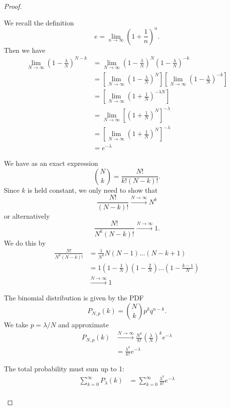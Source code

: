 \begin{proof}
	\begin{parts}
	\item We recall the definition 
		\[
		e = \lim_{n \to \infty} \left( 1+\frac{1}{n} \right)^n
		.\] 
		Then we have
		\begin{align*}
			\lim_{N \to \infty} \left( 1-\frac{\lambda}{N} \right)^{N - k} &=\lim_{N \to \infty} \left( 1-\frac{\lambda}{N} \right)^N \left( 1-\frac{\lambda}{N} \right)^{-k}\\
&=\left[\lim_{N \to \infty} \left( 1-\frac{\lambda}{N} \right)^N \right]\left[ \lim_{N \to \infty} \left( 1-\frac{\lambda}{N} \right)^{-k}\right]\\
&=\left[\lim_{N \to \infty} \left( 1+\frac{1}{N} \right)^{-\lambda N} \right]\\
&=\lim_{N \to \infty} \left[\left( 1+\frac{1}{N} \right)^{N}\right]^{-\lambda} \\
&=\left[\lim_{N \to \infty} \left( 1+\frac{1}{N} \right)^{N}\right]^{-\lambda} \\
&=e^{-\lambda}
		\end{align*}
	\item We have as an exact expression
		\[
		\binom{N}{k} = \frac{N!}{k!(N-k)!}
		.\] 
		Since $k$ is held constant, we only need to show that
		\[
		\frac{N!}{(N-k)!}\xrightarrow{N\to\infty} N^k
		\] 
		or alternatively
		\[
		\frac{N!}{N^k(N-k)!}\xrightarrow{N\to\infty} 1
		.\] 
		We do this by
		\begin{align*}
			\frac{N!}{N^k(N-k)!} &= \frac{1}{N^k}N(N-1)\dots (N-k+1)\\
			&= 1\left( 1- \frac{1}{N} \right)\left( 1 -\frac{2}{N} \right)\dots \left( 1-\frac{k-1}{N} \right)\\
			&\xrightarrow{N\to\infty} 1
		\end{align*}
	\item The binomial distribution is given by the PDF
		\[
		P_{N,p}(k)=\binom{N}{k}p^k q^{n-k}
		.\] 
		We take $p=\lambda / N$ and approximate
		\begin{align*}
			P_{N,p}(k) &\xrightarrow{N\to\infty} \frac{N^k}{k!}\left( \frac{\lambda}{N} \right)^k e^{-\lambda}\\
			&= \frac{\lambda^k}{k!}e^{-\lambda}
		\end{align*}
	\item The total probability must sum up to 1:
		\begin{align*}
			\sum_{k=0}^{\infty} P_\lambda(k) &= \sum_{k=0}^{\infty} \frac{\lambda^k}{k!}e^{-\lambda}\\

\end{align*}
\end{parts}
\end{proof}
